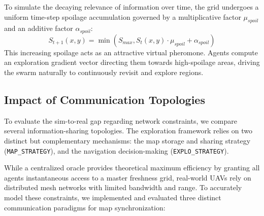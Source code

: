\documentclass[conference]{IEEEtran}
\begin{document}
To simulate the decaying relevance of information over time, the grid undergoes a uniform time-step spoilage accumulation governed by a multiplicative factor $\mu_{spoil}$ and an additive factor $\alpha_{spoil}$:
$$S_{t+1}(x,y) = \min(S_{max}, S_t(x,y) \cdot \mu_{spoil} + \alpha_{spoil})$$
This increasing spoilage acts as an attractive virtual pheromone. Agents compute an exploration gradient vector directing them towards high-spoilage areas, driving the swarm naturally to continuously revisit and explore regions.

\subsection{Impact of Communication Topologies}
To evaluate the sim-to-real gap regarding network constraints, we compare several information-sharing topologies. The exploration framework relies on two distinct but complementary mechanisms: the map storage and sharing strategy (\texttt{MAP\_STRATEGY}), and the navigation decision-making (\texttt{EXPLO\_STRATEGY}).

While a centralized oracle provides theoretical maximum efficiency by granting all agents instantaneous access to a master freshness grid, real-world UAVs rely on distributed mesh networks with limited bandwidth and range. To accurately model these constraints, we implemented and evaluated three distinct communication paradigms for map synchronization:
\end{document}
